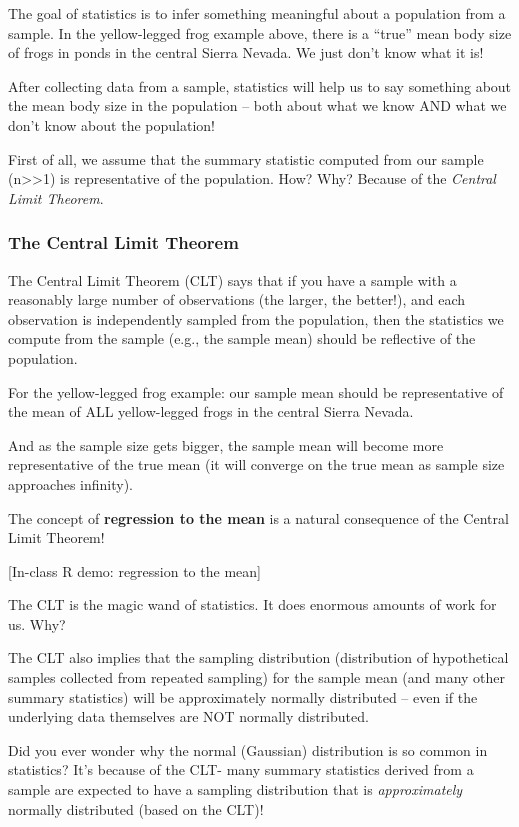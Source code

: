 \documentclass[
]{article}
\begin{document}
The goal of statistics is to infer something meaningful about a
population from a sample. In the yellow-legged frog example above, there
is a ``true'' mean body size of frogs in ponds in the central Sierra
Nevada. We just don't know what it is!

After collecting data from a sample, statistics will help us to say
something about the mean body size in the population -- both about what
we know AND what we don't know about the population!

First of all, we assume that the summary statistic computed from our
sample (n\textgreater\textgreater1) is representative of the population.
How? Why? Because of the \emph{Central Limit Theorem}.

\hypertarget{the-central-limit-theorem}{%
\subsubsection{The Central Limit
Theorem}\label{the-central-limit-theorem}}

The Central Limit Theorem (CLT) says that if you have a sample with a
reasonably large number of observations (the larger, the better!), and
each observation is independently sampled from the population, then the
statistics we compute from the sample (e.g., the sample mean) should be
reflective of the population.

For the yellow-legged frog example: our sample mean should be
representative of the mean of ALL yellow-legged frogs in the central
Sierra Nevada.

And as the sample size gets bigger, the sample mean will become more
representative of the true mean (it will converge on the true mean as
sample size approaches infinity).

The concept of \textbf{regression to the mean} is a natural consequence
of the Central Limit Theorem!

{[}In-class R demo: regression to the mean{]}

The CLT is the magic wand of statistics. It does enormous amounts of
work for us. Why?

The CLT also implies that the sampling distribution (distribution of
hypothetical samples collected from repeated sampling) for the sample
mean (and many other summary statistics) will be approximately normally
distributed -- even if the underlying data themselves are NOT normally
distributed.

Did you ever wonder why the normal (Gaussian) distribution is so common
in statistics? It's because of the CLT- many summary statistics derived
from a sample are expected to have a sampling distribution that is
\emph{approximately} normally distributed (based on the CLT)!
\end{document}
